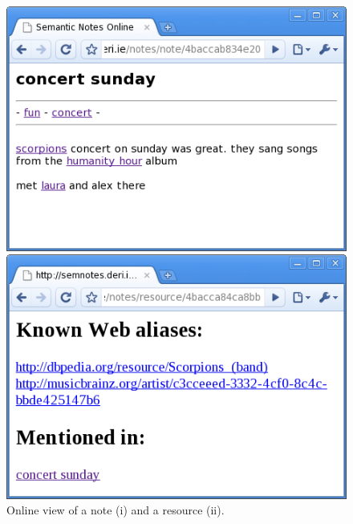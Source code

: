 \begin{figure}[tb]
\begin{minipage}[b]{0.49\linewidth}
\begin{flushleft}
    \includegraphics[width=0.97\linewidth]{chapters/core/img/noteview}
\end{flushleft}
\end{minipage}
\begin{minipage}[b]{0.49\linewidth}
\begin{flushright}
    \includegraphics[width=0.97\linewidth]{chapters/core/img/resourceview}
\end{flushright}
\end{minipage}
\caption{Online view of a note (i) and a resource (ii).}
\label{fig:views}
\end{figure}
